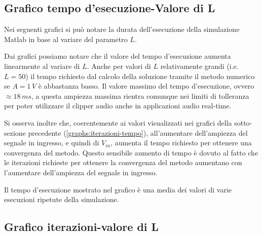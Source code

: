 		\subsection{Grafico tempo d'esecuzione-Valore di L}
			Nei seguenti grafici si può notare la durata dell'esecuzione della simulazione Matlab in base al variare del parametro $L$.
			\graficospace
			\graficospace
			\graficospace
			
			Dai grafici possiamo notare che il valore del tempo d'esecuzione aumenta linearmente al variare di $L$. Anche per valori di $L$ relativamente grandi (i.e. $L = 50$) il tempo richiesto dal calcolo della soluzione tramite il metodo numerico se $A = 1\,V$ è abbastanza basso. Il valore massimo del tempo d'esecuzione, ovvero $\approx 18\,ms$,  a questa ampiezza massima rientra comunque nei limiti di tolleranza per poter utilizzare il clipper audio anche in applicazioni audio real-time.
			
			Si osserva inoltre che, coerentemente ai valori visualizzati nei grafici della sotto-sezione precedente (\ref{graphs:iterazioni-tempo}), all'aumentare dell'ampiezza del segnale in ingresso, e quindi di $V_{in}$, aumenta il tempo richiesto per ottenere una convergenza del metodo. Questo sensibile aumento di tempo è dovuto al fatto che le iterazioni richieste per ottenere la convergenza del metodo aumentano con l'aumentare dell'ampiezza del segnale in ingresso.
			
			
			Il tempo d'esecuzione mostrato nel grafico è una media dei valori di varie esecuzioni ripetute della simulazione.
			
		\subsection{Grafico iterazioni-valore di L}
			
